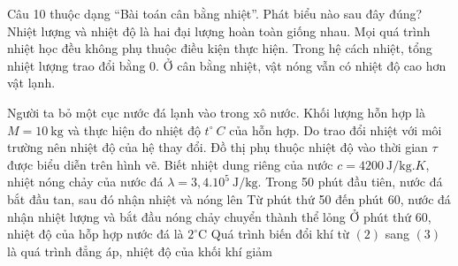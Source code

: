 \begin{ex}
Câu 10 thuộc dạng “Bài toán cân bằng nhiệt”. Phát biểu nào sau đây đúng?
\choice
{Nhiệt lượng và nhiệt độ là hai đại lượng hoàn toàn giống nhau.}
{Mọi quá trình nhiệt học đều không phụ thuộc điều kiện thực hiện.}
{\True Trong hệ cách nhiệt, tổng nhiệt lượng trao đổi bằng 0.}
{Ở cân bằng nhiệt, vật nóng vẫn có nhiệt độ cao hơn vật lạnh.}
\end{ex}

\begin{ex}
Người ta bỏ một cục nước đá lạnh vào trong xô nước. Khối lượng hỗn hợp là $M=10\ \mathrm{kg}$ và thực hiện đo nhiệt độ $t^\circ \ C$ của hỗn hợp. Do trao đổi nhiệt với môi trường nên nhiệt độ của hệ thay đổi. Đồ thị phụ thuộc nhiệt độ vào thời gian $\tau$ được biểu diễn trên hình vẽ. Biết nhiệt dung riêng của nước $c=4200\ \mathrm{J / kg} . K$, nhiệt nóng chảy của nước đá $\lambda=3,4 . 10^{5}\ \mathrm{J /kg}$.
\choiceTF
{\True Trong 50 phút đầu tiên, nước đá bắt đầu tan, sau đó nhận nhiệt và nóng lên}
{Từ phút thứ 50 đến phút 60, nước đá nhận nhiệt lượng và bắt đầu nóng chảy 
chuyển thành thể lỏng}
{\True Ở phút thứ 60, nhiệt độ của hỗp hợp nước đá là $2^\circ \mathrm{C}$}
{\True Quá trình biến đổi khí từ $(2)$ sang $(3)$ là quá trình đẳng áp, nhiệt độ của khối khí giảm}
\end{ex}

